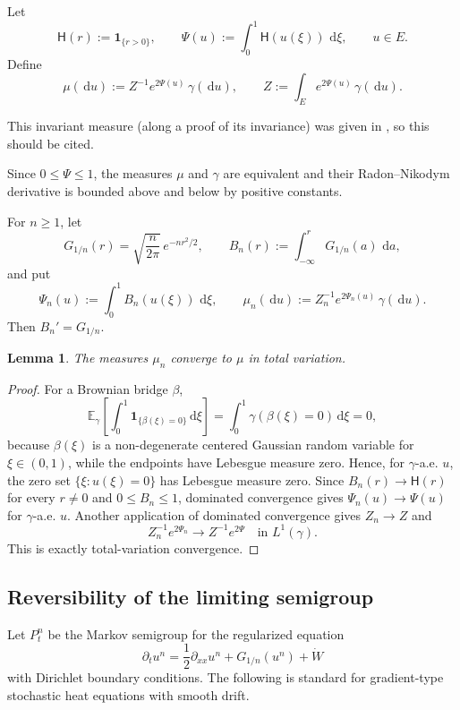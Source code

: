 \documentclass[12pt]{article}
\numberwithin{equation}{section}
\newtheorem{lemma}[theorem]{Lemma}
\newcommand{\dd}{\,\mathrm d}
\newcommand{\1}{\mathbf 1}
\newcommand{\E}{\mathbb E}
\newcommand{\review}[1]{\begin{reviewbox}#1\end{reviewbox}}
\begin{document}
Let
\[
        \mathsf H(r):=\1_{\{r>0\}},\qquad
        \Psi(u):=\int_0^1 \mathsf H(u(\xi))\,\dd \xi,\qquad u\in E.
\]
Define
\begin{equation}\label{eq:mu-def}
        \mu(\dd u)
        := Z^{-1}e^{2\Psi(u)}\,\gamma(\dd u),
        \qquad
        Z:=\int_E e^{2\Psi(u)}\,\gamma(\dd u).
\end{equation}\review{This invariant measure (along a proof of its invariance) was given in \cite{BZ14}, so this should be cited.}
Since $0\leq \Psi\leq 1$, the measures $\mu$ and $\gamma$ are equivalent and their
Radon--Nikodym derivative is bounded above and below by positive constants.

For $n\geq 1$, let
\[
        G_{1/n}(r)=\sqrt{\frac{n}{2\pi}}\,e^{-nr^2/2},\qquad
        B_n(r):=\int_{-\infty}^r G_{1/n}(a)\,\dd a,
\]
and put
\[
        \Psi_n(u):=\int_0^1 B_n(u(\xi))\,\dd \xi,\qquad
        \mu_n(\dd u):=Z_n^{-1}e^{2\Psi_n(u)}\,\gamma(\dd u).
\]
Then $B_n'=G_{1/n}$.

\begin{lemma}\label{lem:mu-n-tv}
The measures $\mu_n$ converge to $\mu$ in total variation.
\end{lemma}

\begin{proof}
For a Brownian bridge $\beta$,
\[
    \E_\gamma\!\left[\int_0^1 \1_{\{\beta(\xi)=0\}}\dd \xi\right]
    =\int_0^1 \gamma(\beta(\xi)=0)\dd \xi=0,
\]
because $\beta(\xi)$ is a non-degenerate centered Gaussian random variable for
$\xi\in(0,1)$, while the endpoints have Lebesgue measure zero. Hence, for
$\gamma$-a.e. $u$, the zero set $\{\xi:u(\xi)=0\}$ has Lebesgue measure zero.
Since $B_n(r)\to \mathsf H(r)$ for every $r\neq0$ and $0\leq B_n\leq1$, dominated
convergence gives $\Psi_n(u)\to\Psi(u)$ for $\gamma$-a.e. $u$. Another application
of dominated convergence gives $Z_n\to Z$ and
\[
        Z_n^{-1}e^{2\Psi_n}\longrightarrow Z^{-1}e^{2\Psi}
        \quad\text{in }L^1(\gamma).
\]
This is exactly total-variation convergence.
\end{proof}

\subsection{Reversibility of the limiting semigroup}

Let $P_t^n$ be the Markov semigroup for the regularized equation
\[
    \partial_t u^n=\frac12\partial_{xx}u^n+G_{1/n}(u^n)+\dot W
\]
with Dirichlet boundary conditions. The following is standard for gradient-type
stochastic heat equations with smooth drift.
\end{document}

